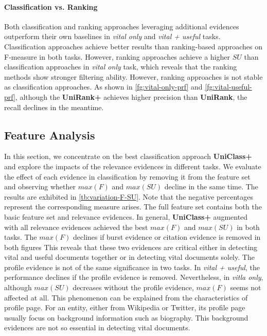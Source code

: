 \documentclass{sig-alternate}
\begin{document}
\paragraph{Classification vs. Ranking} 
Both classification and ranking approaches leveraging additional evidences outperform their own baselines in \textit{vital only} and \textit{vital + useful} tasks. Classification approaches achieve better results than ranking-based approaches on F-measure in both tasks. However, ranking approaches achieve a higher $SU$ than classification approaches in \textit{vital only} task, which reveals that the ranking methods show stronger filtering ability. However, ranking approaches is not stable as classification approaches. As shown in \autoref{fg:vital-only-prf} and \autoref{fg:vital-useful-prf}, although the \textbf{UniRank+} achieves higher precision than \textbf{UniRank}, the recall declines in the meantime.

\subsection{Feature Analysis}
In this section, we concentrate on the best classification approach \textbf{UniClass+} and explore the impacts of the relevance evidences in different tasks. We evaluate the effect of each evidence in classification by removing it from the feature set and observing whether $max(F)$ and $max(SU)$ decline in the same time. The results are exhibited in \autoref{tb:variation-F-SU}. Note that the negative percentages represent the corresponding measure arises. The full feature set contains both the basic feature set and relevance evidences.
In general, \textbf{UniClass+} augmented with all relevance evidences achieved the best $max(F)$ and $max(SU)$ in both tasks. The $max(F)$ declines if burst evidence or citation evidence is removed in both figures This reveals that these two evidences are critical either in detecting vital and useful documents together or in detecting vital documents solely. The profile evidence is not of the same significance in two tasks. In \textit{vital + useful}, the performance declines if the profile evidence is removed. Nevertheless, in \textit{vitla only}, although $max(SU)$ decreases without the profile evidence, $max(F)$ seems not affected at all. This phenomenon can be explained from the characteristics of profile page. For an entity, either from Wikipedia or Twitter, its profile page usually focus on background information such as biography. This background evidences are not so essential in detecting vital documents.
\end{document}
